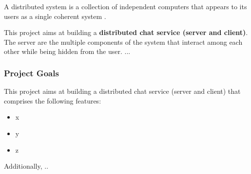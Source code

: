 A distributed system is a collection of independent computers that appears to its users as a single coherent system \cite{dsp2006}.  


This project aims at building a \textbf{distributed chat service (server and client)}. The server are the multiple components of the system that interact among each other while being hidden from the user. ... 

\subsubsection{Project Goals}
This project aims at building a distributed chat service (server and client) that comprises the following features:
\begin{itemize}
\item x
\item y
\item z
\end{itemize}

Additionally, ..
